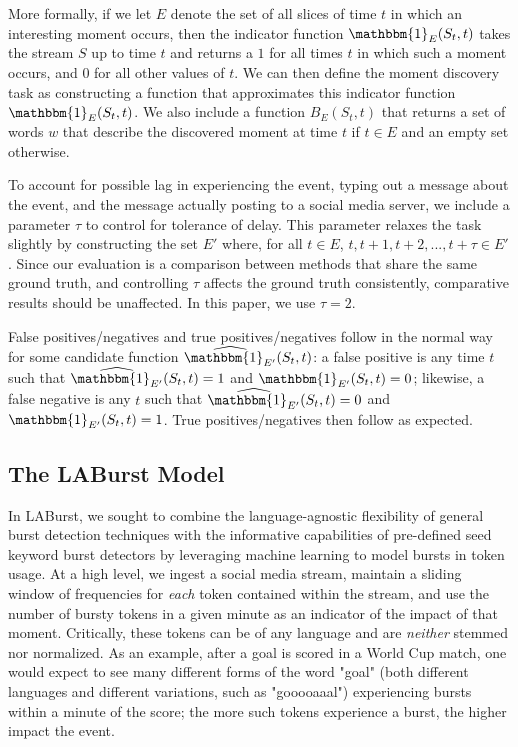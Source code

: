 \documentclass[letterpaper]{article}
\begin{document}
More formally, if we let $E$ denote the set of all slices of time $t$ in which an interesting moment occurs, then the indicator function $\mathbbm{1}_E(S_t, t)$ takes the stream $S$ up to time $t$ and returns a $1$ for all times $t$ in which such a moment occurs, and $0$ for all other values of $t$. 
We can then define the moment discovery task as constructing a function that approximates this indicator function $\mathbbm{1}_E(S_t, t)$.
We also include a function $B_E(S_t, t)$ that returns a set of words $w$ that describe the discovered moment at time $t$ if $t \in E$ and an empty set otherwise.

To account for possible lag in experiencing the event, typing out a message about the event, and the message actually posting to a social media server, we include a parameter $\tau$ to control for tolerance of delay.
This parameter relaxes the task slightly by constructing the set $E'$ where, for all $t \in E$, $t, t+1, t+2, ..., t+\tau \in E'$.
Since our evaluation is a comparison between methods that share the same ground truth, and controlling $\tau$ affects the ground truth consistently, comparative results should be unaffected.
In this paper, we use $\tau=2$.

False positives/negatives and true positives/negatives follow in the normal way for some candidate function $\widehat{\mathbbm{1}_{E'}}(S_t, t)$: a false positive is any time $t$ such that $\widehat{\mathbbm{1}_{E'}}(S_t, t) = 1$ and ${\mathbbm{1}_{E'}}(S_t, t) = 0$; likewise, a false negative is any $t$ such that $\widehat{\mathbbm{1}_{E'}}(S_t, t) = 0$ and ${\mathbbm{1}_{E'}}(S_t, t) = 1$.
True positives/negatives then follow as expected.

\subsection{The LABurst Model}

In LABurst, we sought to combine the language-agnostic flexibility of general burst detection techniques with the informative capabilities of pre-defined seed keyword burst detectors by leveraging machine learning to model bursts in token usage.
At a high level, we ingest a social media stream, maintain a sliding window of frequencies for \emph{each} token contained within the stream, and use the number of bursty tokens in a given minute as an indicator of the impact of that moment.
Critically, these tokens can be of any language and are \emph{neither} stemmed nor normalized.
As an example, after a goal is scored in a World Cup match, one would expect to see many different forms of the word "goal" (both different languages and different variations, such as "gooooaaal") experiencing bursts within a minute of the score; the more such tokens experience a burst, the higher impact the event.
\end{document}
